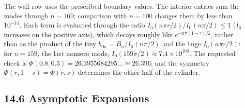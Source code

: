 The wall row uses the prescribed boundary values. The interior
entries sum the modes through $n=160$; comparison with $n=100$
changes them by less than $10^{-14}$. Each term is evaluated
through the ratio $I_0(n\pi r/2)/I_0(n\pi/2)\le1$ ($I_0$ increases
on the positive axis), which decays roughly like
$e^{-n\pi(1-r)/2}$, rather than as the product of the tiny
$b_{0n}=B_n/I_0(n\pi/2)$ and the huge $I_0(n\pi r/2)$: for
$n=159$, the last nonzero mode, $I_0(159\pi/2)\approx7.4\times10^{106}$.
The requested check is
$\Phi(0.8,0.3)=26.3955684295\ldots\simeq26.396$, and the symmetry
$\Phi(r,1-s)=\Phi(r,s)$ determines the other half of the cylinder.

\subsection*{14.6 Asymptotic Expansions}

